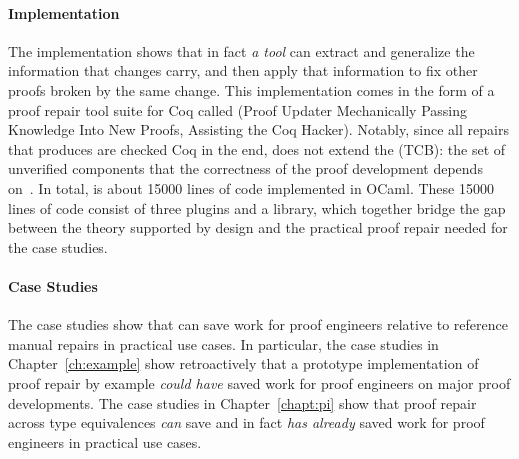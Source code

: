 \paragraph{Implementation}
The implementation shows that in fact \textit{a tool} can extract and generalize the information that changes carry,
and then apply that information to fix other proofs broken by the same change.
This implementation comes in the form of a proof repair tool suite for Coq called \intro{\sysnamelong} (Proof Updater Mechanically Passing Knowledge Into New Proofs, Assisting the Coq Hacker).
Notably, since all repairs that \sysnamelong produces are checked Coq in the end, \sysnamelong does not extend the  (TCB):
the set of unverified components that the correctness of the proof development depends on~\cite{PGL-045}.
In total, \sysnamelong is about 15000 lines of code implemented in OCaml.
These 15000 lines of code consist of three plugins and a library,
which together bridge the gap between the theory supported by design and the practical proof repair needed for the case studies.

\paragraph{Case Studies}
The case studies show that \sysnamelong can save work for proof engineers relative to 
reference manual repairs in practical use cases. %
In particular, the case studies in Chapter~\ref{ch:example} show retroactively that a prototype implementation of proof repair
by example \textit{could have} saved work for proof engineers on major proof developments.
The case studies in Chapter~\ref{chapt:pi} show that proof repair across type equivalences \textit{can} save
and in fact \textit{has already} saved work for proof engineers in practical use cases.


